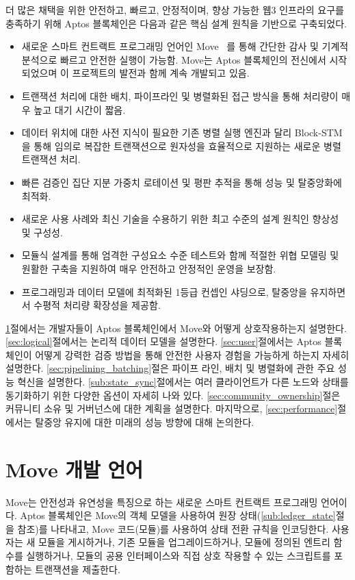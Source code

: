\documentclass{article}
\begin{document}
더 많은 채택을 위한 안전하고, 빠르고, 안정적이며, 향상 가능한 웹3 인프라의 요구를 충족하기 위해 Aptos 블록체인은 다음과 같은 핵심 설계 원칙을 기반으로 구축되었다.
\begin{itemize}
    \item 새로운 스마트 컨트랙트 프로그래밍 언어인 Move~\cite{move} 를 통해 간단한 감사 및 기계적 분석으로 빠르고 안전한 실행이 가능함. Move는 Aptos 블록체인의 전신에서 시작되었으며 이 프로젝트의 발전과 함께 계속 개발되고 있음.
    \item 트랜잭션 처리에 대한 배치, 파이프라인 및 병렬화된 접근 방식을 통해 처리량이 매우 높고 대기 시간이 짧음.
    \item 데이터 위치에 대한 사전 지식이 필요한 기존 병렬 실행 엔진과 달리 Block-STM을 통해 임의로 복잡한 트랜잭션으로 원자성을 효율적으로 지원하는 새로운 병렬 트랜잭션 처리.
    \item 빠른 검증인 집단 지분 가중치 로테이션 및 평판 추적을 통해 성능 및 탈중앙화에 최적화.
    \item 새로운 사용 사례와 최신 기술을 수용하기 위한 최고 수준의 설계 원칙인 향상성 및 구성성.
    \item 모듈식 설계를 통해 엄격한 구성요소 수준 테스트와 함께 적절한 위협 모델링 및 원활한 구축을 지원하여 매우 안전하고 안정적인 운영을 보장함.
    \item 프로그래밍과 데이터 모델에 최적화된 1등급 컨셉인 샤딩으로, 탈중앙을 유지하면서 수평적 처리량 확장성을 제공함.
\end{itemize}
\ref{sec:move}절에서는 개발자들이 Aptos 블록체인에서 Move와 어떻게 상호작용하는지 설명한다. \ref{sec:logical}절에서는 논리적 데이터 모델을 설명한다. \ref{sec:user}절에서는 Aptos 블록체인이 어떻게 강력한 검증 방법을 통해 안전한 사용자 경험을 가능하게 하는지 자세히 설명한다. \ref{sec:pipelining_batching}절은 파이프 라인, 배치 및 병렬화에 관한 주요 성능 혁신을 설명한다. \ref{sub:state_sync}절에서는 여러 클라이언트가 다른 노드와 상태를 동기화하기 위한 다양한 옵션이 자세히 나와 있다. \ref{sec:community_ownership}절은 커뮤니티 소유 및 거버넌스에 대한 계획을 설명한다. 마지막으로, \ref{sec:performance}절에서는 탈중앙 유지에 대한 미래의 성능 방향에 대해 논의한다.

\section{Move 개발 언어}
\label{sec:move}

Move는 안전성과 유연성을 특징으로 하는 새로운 스마트 컨트랙트 프로그래밍 언어이다. Aptos 블록체인은 Move의 객체 모델을 사용하여 원장 상태(\ref{sub:ledger_state}절을 참조)를 나타내고, Move 코드(모듈)를 사용하여 상태 전환 규칙을 인코딩한다. 사용자는 새 모듈을 게시하거나, 기존 모듈을 업그레이드하거나, 모듈에 정의된 엔트리 함수를 실행하거나, 모듈의 공용 인터페이스와 직접 상호 작용할 수 있는 스크립트를 포함하는 트랜잭션을 제출한다.
\end{document}
